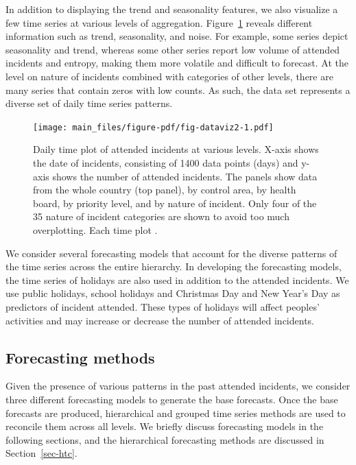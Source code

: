 \documentclass[
  authoryear,
  preprint,
  3p]{elsarticle}
\begin{document}
In addition to displaying the trend and seasonality features, we also
visualize a few time series at various levels of aggregation.
Figure~\ref{fig-dataviz2} reveals different information such as trend,
seasonality, and noise. For example, some series depict seasonality and
trend, whereas some other series report low volume of attended incidents
and entropy, making them more volatile and difficult to forecast. At the
level on nature of incidents combined with categories of other levels,
there are many series that contain zeros with low counts. As such, the
data set represents a diverse set of daily time series patterns.

\begin{figure}

{\centering \texttt{[image: main\_files/figure-pdf/fig-dataviz2-1.pdf]}

}

\caption{\label{fig-dataviz2}Daily time plot of attended incidents at
various levels. X-axis shows the date of incidents, consisting of 1400
data points (days) and y-axis shows the number of attended incidents.
The panels show data from the whole country (top panel), by control
area, by health board, by priority level, and by nature of incident.
Only four of the 35 nature of incident categories are shown to avoid too
much overplotting. Each time plot .}

\end{figure}

We consider several forecasting models that account for the diverse
patterns of the time series across the entire hierarchy. In developing
the forecasting models, the time series of holidays are also used in
addition to the attended incidents. We use public holidays, school
holidays and Christmas Day and New Year's Day as predictors of incident
attended. These types of holidays will affect peoples' activities and
may increase or decrease the number of attended incidents.

\hypertarget{forecasting-methods}{%
\subsection{Forecasting methods}\label{forecasting-methods}}

Given the presence of various patterns in the past attended incidents,
we consider three different forecasting models to generate the base
forecasts. Once the base forecasts are produced, hierarchical and
grouped time series methods are used to reconcile them across all
levels. We briefly discuss forecasting models in the following sections,
and the hierarchical forecasting methods are discussed in
Section~\ref{sec-htc}.
\end{document}
